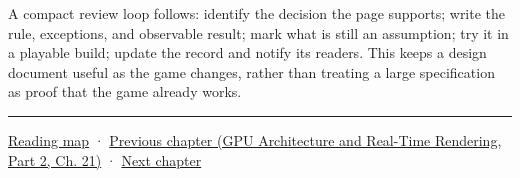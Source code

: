 A compact review loop follows: identify the decision the page supports; write the rule, exceptions, and observable result; mark what is still an assumption; try it in a playable build; update the record and notify its readers. This keeps a design document useful as the game changes, rather than treating a large specification as proof that the game already works.

\begin{center}\rule{0.5\linewidth}{0.5pt}\end{center}

\hyperref[volume-reading-map]{Reading map} · \href{../06-GPU-Architecture-and-Real-Time-Rendering-P02/main.pdf\#nameddest=06-engine-ii-ch045-rasterizing-kernels-and-connecting-world-identity}{Previous chapter (GPU Architecture and Real-Time Rendering, Part 2, Ch. 21)} · \hyperref[06-engine-ii-ch047-narrative-simulation-and-ai-in-playable-worlds]{Next chapter}
